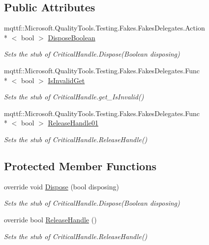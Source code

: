 \subsection*{Public Attributes}
\begin{DoxyCompactItemize}
\item 
mqttf\-::\-Microsoft.\-Quality\-Tools.\-Testing.\-Fakes.\-Fakes\-Delegates.\-Action\\*
$<$ bool $>$ \hyperlink{class_system_1_1_runtime_1_1_interop_services_1_1_fakes_1_1_stub_critical_handle_a62343173def0e5bce9315e7a95ab4523}{Dispose\-Boolean}
\begin{DoxyCompactList}\small\item\em Sets the stub of Critical\-Handle.\-Dispose(\-Boolean disposing)\end{DoxyCompactList}\item 
mqttf\-::\-Microsoft.\-Quality\-Tools.\-Testing.\-Fakes.\-Fakes\-Delegates.\-Func\\*
$<$ bool $>$ \hyperlink{class_system_1_1_runtime_1_1_interop_services_1_1_fakes_1_1_stub_critical_handle_ad5bbfdfa82aac8a90f3f5e46ab125bf3}{Is\-Invalid\-Get}
\begin{DoxyCompactList}\small\item\em Sets the stub of Critical\-Handle.\-get\-\_\-\-Is\-Invalid()\end{DoxyCompactList}\item 
mqttf\-::\-Microsoft.\-Quality\-Tools.\-Testing.\-Fakes.\-Fakes\-Delegates.\-Func\\*
$<$ bool $>$ \hyperlink{class_system_1_1_runtime_1_1_interop_services_1_1_fakes_1_1_stub_critical_handle_ad2a22e2ee8c74f70fb264ff1d89ed4bb}{Release\-Handle01}
\begin{DoxyCompactList}\small\item\em Sets the stub of Critical\-Handle.\-Release\-Handle()\end{DoxyCompactList}\end{DoxyCompactItemize}
\subsection*{Protected Member Functions}
\begin{DoxyCompactItemize}
\item 
override void \hyperlink{class_system_1_1_runtime_1_1_interop_services_1_1_fakes_1_1_stub_critical_handle_a7b646cf4ae83d12ae4d0181bb6b3fbc6}{Dispose} (bool disposing)
\begin{DoxyCompactList}\small\item\em Sets the stub of Critical\-Handle.\-Dispose(\-Boolean disposing)\end{DoxyCompactList}\item 
override bool \hyperlink{class_system_1_1_runtime_1_1_interop_services_1_1_fakes_1_1_stub_critical_handle_a61646b1d4cfbca1312a8e7d218a46a55}{Release\-Handle} ()
\begin{DoxyCompactList}\small\item\em Sets the stub of Critical\-Handle.\-Release\-Handle()\end{DoxyCompactList}\end{DoxyCompactItemize}
